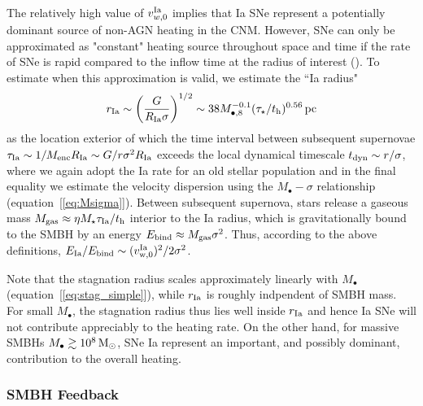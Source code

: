 \documentclass[usenatbib,fleqn]{mn2e}
\newcommand{\Mbh}[1][]{M_{\bullet#1}}
\newcommand{\rIa}{r_{\rm Ia}}
\begin{document}
  The relatively high value of $v_{w,0}^{\rm Ia}$ implies that Ia SNe
  represent a potentially dominant source of non-AGN heating in the
  CNM.  However, SNe can only be approximated as "constant" heating
  source throughout space and time if the rate of SNe is rapid
  compared to the inflow time at the radius of interest
  (\citealt{ShcherbakovWong+:2014a}).  To estimate when this
  approximation is valid, we estimate the ``Ia radius"
  \begin{align}
    r_{\rm Ia} \sim \left(\frac{G}{R_{\rm Ia}\sigma}\right)^{1/2} \sim
    38 M_{\bullet,8}^{-0.1}(\tau_{\star}/t_{\rm h})^{0.56}\,{\rm pc}
    \label{eq:rIa}
  \end{align}
as the location exterior of which the time interval between subsequent
supernovae $\tau_{\rm Ia} \sim 1/M_{\rm enc}R_{\rm Ia} \sim
G/r\sigma^{2}R_{\rm Ia}$ exceeds the local dynamical timescale $t_{\rm
dyn} \sim r/\sigma$, where we again adopt the Ia rate for an old
stellar population and in the final equality we estimate the velocity
dispersion using the $M_{\bullet}-\sigma$ relationship
(equation~[\ref{eq:Msigma}]).  Between subsequent supernova, stars
release a gaseous mass $M_{\rm gas} \approx \eta M_{\star}\tau_{\rm
Ia}/t_{\rm h}$ interior to the Ia radius, which is gravitationally
bound to the SMBH by an energy $E_{\rm bind} \approx M_{\rm
gas}\sigma^{2}$.  Thus, according to the above definitions, $E_{\rm
Ia}/E_{\rm bind} \sim (v_{\rm w,0}^{\rm Ia})^{2}/2\sigma^{2}$.



Note that the stagnation radius scales approximately linearly with
$M_{\bullet}$ (equation~[\ref{eq:stag_simple}]), while $\rIa$ is
roughly indpendent of SMBH mass.  For small $\Mbh$, the stagnation
radius thus lies well inside $\rIa$ and hence Ia SNe will not
contribute appreciably to the heating rate.  On the other hand, for
massive SMBHs $M_{\bullet} \gtrsim 10^8 \,{\rm M_\odot}$, SNe Ia represent an
important, and possibly dominant, contribution to the overall heating.

\subsubsection{SMBH Feedback}
\end{document}
